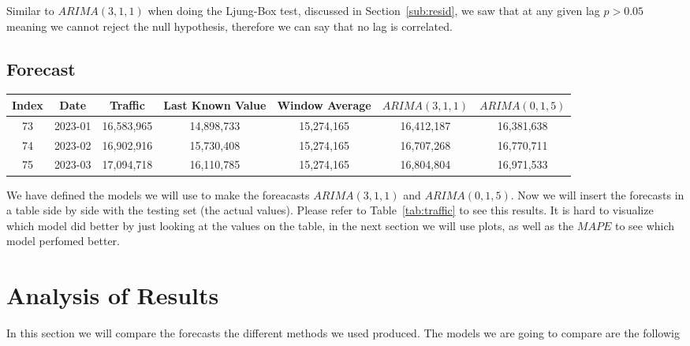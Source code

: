 \documentclass[journal]{IEEEtran}
\begin{document}
Similar to $ARIMA(3,1,1)$ when doing the Ljung-Box test, discussed in
Section~\ref{sub:resid}, we saw that at any given lag $p > 0.05$ meaning we
cannot reject the null hypothesis, therefore we can say that no lag is
correlated.

\subsection{Forecast}

\begin{table*}[htbp]
  \centering
  \caption{Traffic Data}
  \label{tab:traffic}
  \begin{tabular}{|c|c|c|c|c|c|c|}
    \hline
      Index & Date & Traffic & Last Known Value & Window Average & $ARIMA(3,1,1)
$ & $ARIMA(0,1,5)$ \\
    \hline
        73 & 2023-01 & 16,583,965 & 14,898,733 & 15,274,165 & 16,412,187 & 16,381,638 \\
        74 & 2023-02 & 16,902,916 & 15,730,408 & 15,274,165 & 16,707,268 & 16,770,711 \\
        75 & 2023-03 & 17,094,718 & 16,110,785 & 15,274,165 & 16,804,804 & 16,971,533 \\
    \hline
  \end{tabular}
\end{table*}

We have defined the models we will use to make the foreacasts $ARIMA(3,1,1)$
and $ARIMA(0,1,5)$. Now we will insert the forecasts in a table side by side
with the testing set (the actual values). Please refer to
Table~\ref{tab:traffic} to see this results. It is hard to visualize which
model did better by just looking at the values on the table, in the next
section we will use plots, as well as the $MAPE$ to see which model perfomed
better.


\section{Analysis of Results}\label{sec:analysis}

In this section we will compare the forecasts the different methods we
used produced. The models we are going to compare are the followig
\end{document}
